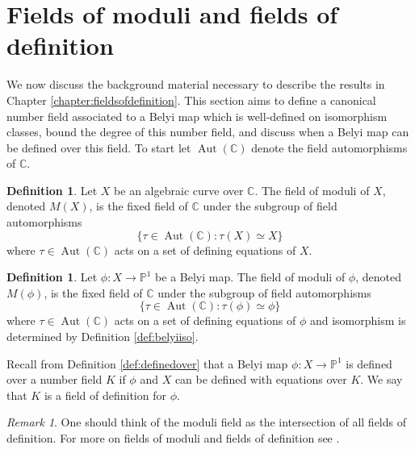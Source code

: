 \documentclass{dcthesis}
\newcommand{\PP}{\mathbb P}
\newcommand{\CC}{\mathbb C}
\newcommand{\defi}[1]{\textsf{#1}}
\DeclareMathOperator{\Aut}{Aut}
\numberwithin{equation}{section}
\theoremstyle{definition}
\newtheorem{definition}[equation]{Definition}
\theoremstyle{remark}
\newtheorem{remark}[equation]{Remark}
\begin{document}
{{  \section{Fields of moduli and fields of definition}{\label{sec:fieldsofmodulifieldsofdefinition}
    We now discuss the background
    material necessary to describe
    the results in
    Chapter \ref{chapter:fieldsofdefinition}.
    This section aims
    to define a canonical number field
    associated to a Belyi map
    which is well-defined on isomorphism classes,
    bound the degree of this number field,
    and discuss when a Belyi map can be defined
    over this field.
    To start let $\Aut(\CC)$ denote the
    field automorphisms of $\CC$.
    \begin{definition}
      \label{def:fieldofmoduli}
      Let $X$ be an algebraic curve over $\CC$.
      The \defi{field of moduli} of $X$,
      denoted $M(X)$,
      is the fixed field of $\CC$ under
      the subgroup of field automorphisms
      \begin{equation}
        \label{eqn:fixedfield}
        \{\tau\in\Aut(\CC) : \tau(X)\simeq X\}
      \end{equation}
      where $\tau\in\Aut(\CC)$ acts on
      a set of defining equations of $X$.
    \end{definition}
    \begin{definition}
      \label{def:fieldofmodulibelyimap}
      Let $\phi\colon X\to\PP^1$ be a Belyi map.
      The \defi{field of moduli} of $\phi$,
      denoted $M(\phi)$,
      is the fixed field of $\CC$ under
      the subgroup of
      field automorphisms
      \begin{equation}
        \label{eqn:fixedfieldphi}
        \{\tau\in\Aut(\CC) : \tau(\phi)\simeq\phi\}
      \end{equation}
      where $\tau\in\Aut(\CC)$ acts on
      a set of defining equations of $\phi$
      and isomorphism is determined by
      Definition \ref{def:belyiiso}.
    \end{definition}
    Recall from Definition \ref{def:definedover}
    that a Belyi map
    $\phi\colon X\to\PP^1$
    is defined over a number field $K$
    if $\phi$ and $X$ can be defined with
    equations over $K$.
    We say that $K$
    is a \defi{field of definition}
    for $\phi$.
    \begin{remark}
      One should think of the moduli
      field as the intersection of all fields of definition.
      For more on fields of moduli and fields of definition
      see
      \cite{huggins}.

\end{remark}}}}
\end{document}
